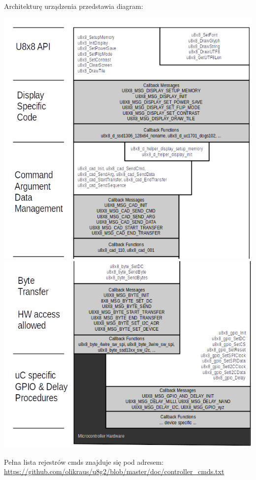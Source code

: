 \documentclass{classrep}
\begin{document}
Architekturę urządzenia przedstawia diagram:\\
\begin{center}
\includegraphics[scale=0.5]{u8g2_software_architecture1}\\
\includegraphics[scale=0.5]{u8g2_software_architecture2}
\end{center}

Pełna lista rejestrów cmds znajduje się pod adresem:\\
\url{https://github.com/olikraus/u8g2/blob/master/doc/controller_cmds.txt}
\end{document}
